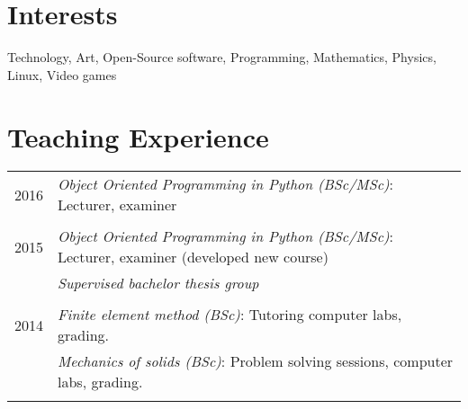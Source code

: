 \documentclass[a4paper,10pt]{article} %
\begin{document}
{



% 
% 
% 
% 
% 
% 


\section{Interests}

Technology, Art, Open-Source software, Programming, Mathematics, Physics, Linux, Video games


\section{Teaching Experience}

\begin{tabular}{r|p{11cm}}
\textsc{2016} 
              & \emph{Object Oriented Programming in Python (BSc/MSc)}: \footnotesize{Lecturer, examiner}\\
\multicolumn{2}{c}{} \\

\textsc{2015} 
	      & \emph{Object Oriented Programming in Python (BSc/MSc)}: \footnotesize{Lecturer, examiner (developed new course)}\\
              & \emph{Supervised bachelor thesis group}\\
\multicolumn{2}{c}{} \\

\textsc{2014} 
              & \emph{Finite element method (BSc)}: \footnotesize{Tutoring computer labs, grading.}\\
              & \emph{Mechanics of solids (BSc)}: \footnotesize{Problem solving sessions, computer labs, grading.}\\
\multicolumn{2}{c}{} \\


\end{tabular}}
\end{document}
